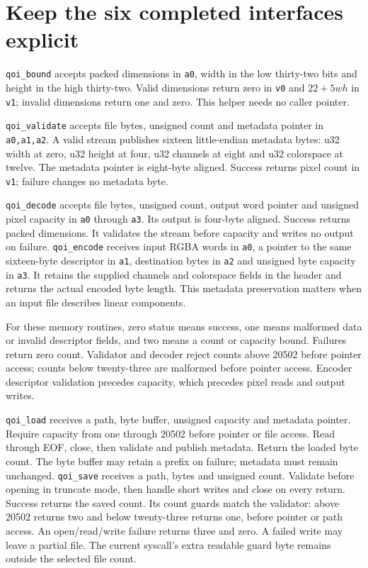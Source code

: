 \section{Keep the six completed interfaces explicit}
\texttt{qoi\_bound} accepts packed dimensions in \texttt{a0}, width in the low
thirty-two bits and height in the high thirty-two. Valid dimensions return zero in
\texttt{v0} and \(22+5wh\) in \texttt{v1}; invalid dimensions return one and zero.
This helper needs no caller pointer.

\texttt{qoi\_validate} accepts file bytes, unsigned count and metadata pointer in
\texttt{a0,a1,a2}. A valid stream publishes sixteen little-endian metadata bytes:
u32 width at zero, u32 height at four, u32 channels at eight and u32 colorspace at twelve.
The metadata pointer is eight-byte aligned. Success returns pixel count in \texttt{v1};
failure changes no metadata byte.

\texttt{qoi\_decode} accepts file bytes, unsigned count, output word pointer and unsigned
pixel capacity in \texttt{a0} through \texttt{a3}. Its output is four-byte aligned.
Success returns packed dimensions. It validates the stream before capacity and writes
no output on failure. \texttt{qoi\_encode} receives input RGBA words in \texttt{a0},
a pointer to the same sixteen-byte descriptor in \texttt{a1}, destination bytes in
\texttt{a2} and unsigned byte capacity in \texttt{a3}. It retains the supplied channels
and colorspace fields in the header and returns the actual encoded byte length.
This metadata preservation matters when an input file describes linear components.

For these memory routines, zero status means success, one means malformed data or
invalid descriptor fields, and two means a count or capacity bound. Failures return
zero count. Validator and decoder reject counts above 20502 before pointer access;
counts below twenty-three are malformed before pointer access. Encoder descriptor
validation precedes capacity, which precedes pixel reads and output writes.

\texttt{qoi\_load} receives a path, byte buffer, unsigned capacity and metadata pointer.
Require capacity from one through 20502 before pointer or file access. Read through EOF,
close, then validate and publish metadata. Return the loaded byte count. The byte buffer
may retain a prefix on failure; metadata must remain unchanged. \texttt{qoi\_save}
receives a path, bytes and unsigned count. Validate before opening in truncate mode,
then handle short writes and close on every return. Success returns the saved count.
Its count guards match the validator: above 20502 returns two and below twenty-three
returns one, before pointer or path access.
An open/read/write failure returns three and zero. A failed write may leave a partial file.
The current syscall's extra readable guard byte remains outside the selected file count.

